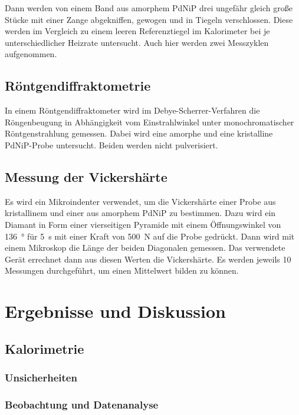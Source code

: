 \documentclass[
	a4paper,
	12pt,
	pagesize,
	ngerman
]{scrartcl}
\begin{document}
	Dann werden von einem Band aus amorphem PdNiP drei ungefähr gleich große Stücke mit einer Zange abgekniffen, gewogen und in Tiegeln verschlossen.
	Diese werden im Vergleich zu einem leeren Referenztiegel im Kalorimeter bei je unterschiedlicher Heizrate untersucht.
	Auch hier werden zwei Messzyklen aufgenommen.

	\subsection{Röntgendiffraktometrie} %
	In einem Röntgendiffraktometer wird im Debye-Scherrer-Verfahren die Röngenbeugung in Abhängigkeit vom Einstrahlwinkel unter monochromatischer Röntgenstrahlung gemessen.
	Dabei wird eine amorphe und eine kristalline PdNiP-Probe untersucht.
	Beiden werden nicht pulverisiert.	%

	\subsection{Messung der Vickershärte}
 	Es wird ein Mikroindenter verwendet, um die Vickershärte einer Probe aus kristallinem und einer aus amorphem PdNiP zu bestimmen. %
	Dazu wird ein Diamant in Form einer vierseitigen Pyramide mit einem Öffnungswinkel von \SI{136}{\degree} für \SI{5}{s} mit einer Kraft von \SI{500}{\newton} auf die Probe gedrückt.
	Dann wird mit einem Mikroskop die Länge der beiden Diagonalen gemessen.
	Das verwendete Gerät errechnet dann aus diesen Werten die Vickershärte.
	Es werden jeweils \num{10} Messungen durchgeführt, um einen Mittelwert bilden zu können.

	\section{Ergebnisse und Diskussion}

	\subsection{Kalorimetrie}
	\subsubsection{Unsicherheiten}
	\subsubsection{Beobachtung und Datenanalyse}
\end{document}
